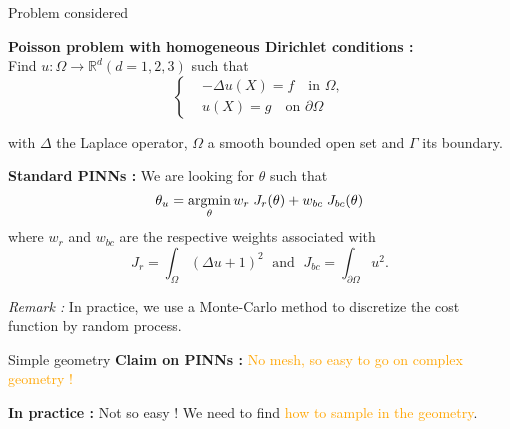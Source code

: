 \begin{frame}{Problem considered}
	\vspace{5pt}
    \begin{minipage}{0.7\linewidth}
    	\textbf{Poisson problem with homogeneous Dirichlet conditions :} \\
    	Find $u : \Omega \rightarrow \mathbb{R}^d (d=1,2,3)$ such that
    	\begin{equation*}
    		\left\{\begin{aligned}
    			&-\Delta u(X) = f \quad \text{in } \Omega, \\
    			&u(X) = g \quad \text{on } \partial \Omega
    		\end{aligned}\right. \label{edp}
    	\end{equation*}
    \end{minipage}
	\begin{minipage}{0.26\linewidth}
		\vspace{-20pt}
	\end{minipage}
	

	with $\Delta$ the Laplace operator, $\Omega$ a smooth bounded open set and $\Gamma$ its boundary.
	
	\textbf{Standard PINNs :} We are looking for $\theta$ such that
	\begin{equation*}
		\theta_u = \operatorname*{argmin}_{\theta} w_{r}\; J_{r}(\theta)+w_{bc}\; J_{bc}(\theta)
	\end{equation*}
	where $w_{r}$ and $w_{bc}$ are the respective weights associated with
	\begin{equation*}
		J_{r} = \int_\Omega (\Delta u+1)^2 \; \text{ and } \; J_{bc} = \int_{\partial\Omega} u^2.
	\end{equation*}	
	
	\footnotesize
	\textit{Remark :} In practice, we use a Monte-Carlo method to discretize the cost function by random process.
\end{frame}

\begin{frame}{Simple geometry}
	\textbf{Claim on PINNs :} \textcolor{orange}{No mesh, so easy to go on complex geometry !}
	
	\centering
	
	\textbf{In practice :} Not so easy ! We need to find \textcolor{orange}{how to sample in the geometry}.
\end{frame}

